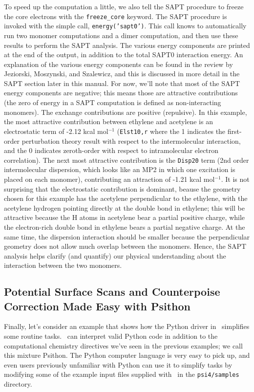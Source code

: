 To speed up the computation a little, we also tell the SAPT procedure to
freeze the core electrons with the {\tt freeze\_core} keyword.  The SAPT
procedure is invoked with the simple call, {\tt energy('sapt0')}.  This
call knows to automatically run two monomer computations and a dimer
computation, and then use these results to perform the SAPT analysis.  The
various energy components are printed at the end of the output, in addition
to the total SAPT0 interaction energy.  An explanation of the various
energy components can be found in the review by Jeziorski, Moszynski, and
Szalewicz,\cite{Jeziorski:1994:1887}  and this is discussed in more detail
in the SAPT section later in this manual.  For now, we'll note that most of
the SAPT energy components are negative; this means those are attractive
contributions (the zero of energy in a SAPT computation is defined as
non-interacting monomers).  The exchange contributions are positive
(repulsive).   In this example, the most attractive contribution between
ethylene and acetylene is an electrostatic term of -2.12 kcal mol$^{-1}$
({\tt Elst10,r} where the 1 indicates the first-order
perturbation theory result with respect to the intermolecular interaction,
and the 0 indicates zeroth-order with respect to intramolecular electron
correlation).  The next most attractive contribution is the {\tt Disp20}
term (2nd order intermolecular dispersion, which looks like an MP2 in which
one excitation is placed on each monomer), contributing an attraction of
-1.21 kcal mol$^{-1}$.  It is not surprising that the electrostatic
contribution is dominant, beause the geometry chosen for this example has the
acetylene perpendicular to the ethylene, with the acetylene hydrogen
pointing directly at the double bond in ethylene; this will be attractive
because the H atoms in acetylene bear a partial positive charge, while the
electron-rich double bond in ethylene bears a partial negative charge.  At
the same time, the dispersion interaction should be smaller because the
perpendicular geometry does not allow much overlap between the monomers.
Hence, the SAPT analysis helps clarify (and quantify) our physical
understanding about the interaction between the two monomers. 

\subsection{Potential Surface Scans and Counterpoise Correction Made Easy
with Psithon}

Finally, let's consider an example that shows how the Python driver
in \PSIfour\ simplifies some routine tasks.  \PSIfour\ can interpret
valid Python code in addition to the computational chemistry directives
we've seen in the previous examples; we call this mixture Psithon.
The Python computer language is very easy to pick up, and even users
previously unfamiliar with Python can use it to simplify tasks by
modifying some of the example input files supplied with \PSIfour\
in the {\tt psi4/samples} directory.

